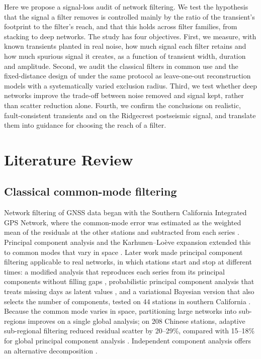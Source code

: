 \documentclass[11pt,a4paper]{article}
\begin{document}
Here we propose a signal-loss audit of network filtering. We test the hypothesis that the signal a filter removes is controlled mainly by the ratio of the transient's footprint to the filter's reach, and that this holds across filter families, from stacking to deep networks. The study has four objectives. First, we measure, with known transients planted in real noise, how much signal each filter retains and how much spurious signal it creates, as a function of transient width, duration and amplitude. Second, we audit the classical filters in common use and the fixed-distance design of \citet{bachelot2025} under the same protocol as leave-one-out reconstruction models with a systematically varied exclusion radius. Third, we test whether deep networks improve the trade-off between noise removed and signal kept, rather than scatter reduction alone. Fourth, we confirm the conclusions on realistic, fault-consistent transients and on the Ridgecrest postseismic signal, and translate them into guidance for choosing the reach of a filter.

\section{Literature Review}

\subsection{Classical common-mode filtering}

Network filtering of GNSS data began with the Southern California Integrated GPS Network, where the common-mode error was estimated as the weighted mean of the residuals at the other stations and subtracted from each series \citep{wdowinski1997}. Principal component analysis and the Karhunen--Lo\`eve expansion extended this to common modes that vary in space \citep{dong2006}. Later work made principal component filtering applicable to real networks, in which stations start and stop at different times: a modified analysis that reproduces each series from its principal components without filling gaps \citep{shen2014}, probabilistic principal component analysis that treats missing days as latent values \citep{gruszczynski2018}, and a variational Bayesian version that also selects the number of components, tested on 44 stations in southern California \citep{li2020vbpca}. Because the common mode varies in space, partitioning large networks into sub-regions improves on a single global analysis; on 208 Chinese stations, adaptive sub-regional filtering reduced residual scatter by 20--29\%, compared with 15--18\% for global principal component analysis \citep{liu2026}. Independent component analysis offers an alternative decomposition \citep{gualandi2016,zhou2022}.
\end{document}
